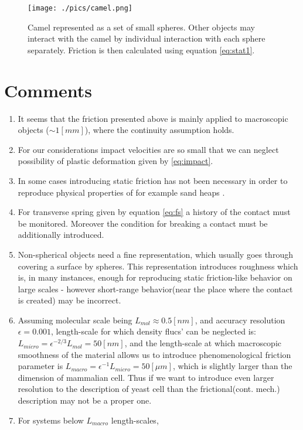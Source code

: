 \documentclass[10pt,a4paper]{article}
\begin{document}
\begin{figure}[tb]
\centering
\texttt{[image: ./pics/camel.png]}
\caption{Camel represented as a set of small spheres\cite{mucha05}. Other objects may interact with the camel by individual interaction with each sphere separately.
Friction is then calculated using equation \ref{eq:stat1}.}
\label{fig:camel}
\end{figure}

\section{Comments}
\begin{enumerate}
 \item It seems that the friction presented above is mainly applied to macroscopic objects ($\sim 1[mm]$), where the continuity assumption holds. 
 \item For our considerations impact velocities are so small that we can neglect possibility of plastic deformation given by \ref{eq:impact}.
 \item In some cases introducing static friction has not been necessary in order to reproduce physical properties of for example sand heaps \cite{pb93, pb95}.
 \item For transverse spring given by equation \ref{eq:fs} a history of the contact must be monitored. 
 Moreover the condition for breaking a contact must be additionally introduced. 
 \item Non-spherical objects need a fine representation, which usually goes through covering a surface by spheres. This representation 
 introduces roughness which is, in many instances, enough for reproducing static friction-like behavior on large scales - 
 however short-range behavior(near the place where the contact is created) may be incorrect.
 \item Assuming molecular scale being $L_{mol}\approx 0.5 [nm]$, and accuracy resolution $\epsilon=0.001$, length-scale for which density flucs' can be neglected is:
 $L_{micro} = \epsilon^{-2/3} L_{mol} = 50 [nm]$, and the length-scale at which macroscopic smoothness of the material allows us to introduce phenomenological friction
 parameter is $L_{macro} = \epsilon^{-1} L_{micro} = 50[\mu m]$, which is slightly larger than the dimension of mammalian cell. Thus if we want to introduce even larger resolution 
 to the description of yeast cell than the frictional(cont. mech.) description may not be a proper one.
 \item For systems below $L_{macro}$ length-scales,

\end{enumerate}
\end{document}

